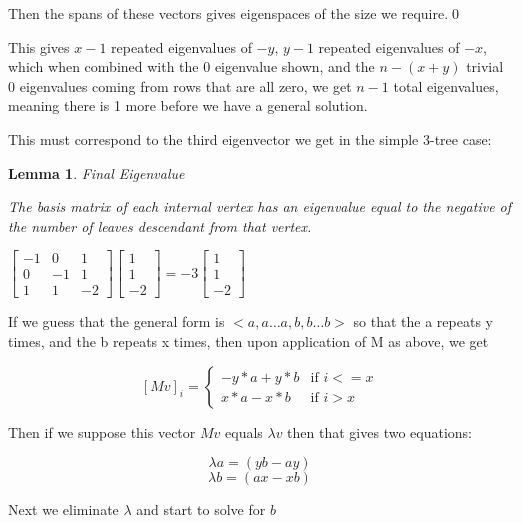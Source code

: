 \documentclass[10pt,a4paper]{report}
\newtheorem{lemma}{Lemma}
\begin{document}
Then the spans of these vectors gives eigenspaces of the size we require.\qed


This gives $x-1$ repeated eigenvalues of $-y$, $y-1$ repeated eigenvalues of
$-x$, which when combined with the 0 eigenvalue shown, and the $n - (x + y)$
trivial $0$ eigenvalues coming from rows that are all zero, we get $n-1$ total
eigenvalues, meaning there is 1 more before we have a general solution.

This must correspond to the third eigenvector we get in the simple 3-tree case:

\begin{lemma} Final Eigenvalue

	The basis matrix of each internal vertex has an eigenvalue equal to the
	negative of the number of leaves descendant from that vertex.
\end{lemma}

$
\left[\begin{matrix}
	-1 & 0 & 1\\
	0 & -1 & 1\\
	1 & 1 & -2
\end{matrix}\right]
\left[\begin{matrix}
	1\\
	1\\
	-2
\end{matrix}\right]
=
-3
\left[\begin{matrix}
	1\\
	1\\
	-2
\end{matrix}\right]
$

If we guess that the general form is $<a, a\ldots a, b, b\ldots b>$ so that the
a repeats y times, and the b repeats x times, then upon application of M as
above, we get

\[ {[Mv]}_i = \begin{cases}
	-y*a + y*b & \text{if } i <= x\\
	x*a - x*b & \text{if } i > x
\end{cases} \]

Then if we suppose this vector $Mv$ equals $\lambda v$ then that gives two
equations:

\begin{equation}
	\lambda a = (yb - ay)
\end{equation}
\begin{equation*}
	\lambda b = (ax - xb)
\end{equation*}

Next we eliminate $\lambda$ and start to solve for $b$
\end{document}
